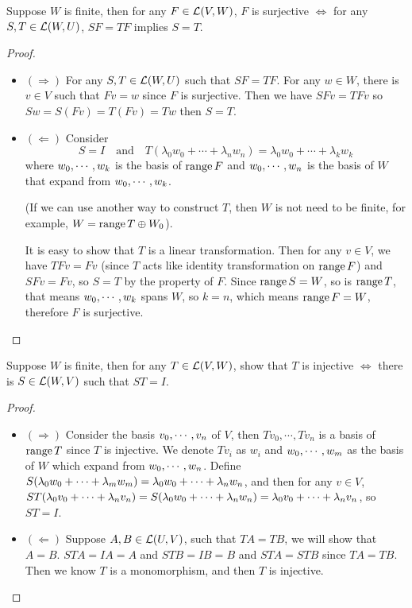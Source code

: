 \documentclass[../main.tex]{subfiles}
\begin{document}
\begin{exercise*}
  Suppose $W$ is finite, then for any $F \in \LT(V, W)$, $F$ is surjective $\iff$ for any $S, T \in \LT(W, U)$, $SF = TF$ implies $S = T$.
\end{exercise*}
\begin{proof}
  ~
  \begin{itemize}
    \item $(\Rightarrow)$ For any $S, T \in \LT(W, U)$ such that $SF = TF$. For any $w \in W$,
          there is $v \in V$ such that $Fv = w$ since $F$ is surjective. Then we have
          $SFv = TFv$ so $Sw = S(Fv) = T(Fv) = Tw$ then $S = T$.
    \item $(\Leftarrow)$ Consider
          \[
          S = I \quad \text{and} \quad T(\lambda_0w_0 + \cdots + \lambda_n w_n) = \lambda_0w_0 + \cdots + \lambda_kw_k
          \]
          where $\join{w}{k}$ is the basis of $\rangev F$ and
          $\join{w}{n}$ is the basis of $W$ that expand from $\join{w}{k}$.

          (If we can use another way to construct $T$, then $W$ is not need to be finite, for example, $W = \rangev T \oplus W_0$).

          It is easy to show that $T$ is a linear transformation. Then for any $v \in V$, we have
          $TFv = Fv$ (since $T$ acts like identity transformation on $\rangev F$) and $SFv = Fv$,
          so $S = T$ by the property of $F$. Since $\rangev S = W$, so is $\rangev T$, that means
          $\join{w}{k}$ spans $W$, so $k = n$, which means $\rangev F = W$, therefore $F$ is surjective.
  \end{itemize}
\end{proof}

\setcounter{exercise}{18}
\begin{exercise}
  Suppose $W$ is finite, then for any $T \in \LT(V, W)$,
  show that $T$ is injective $\iff$ there is $S \in \LT(W, V)$ such that $ST = I$.
\end{exercise}
\begin{proof}
  ~
  \begin{itemize}
    \item $(\Rightarrow)$ Consider the basis $\join{v}{n}$ of $V$, then $Tv_0, \cdots, Tv_n$
          is a basis of $\rangev T$ since $T$ is injective. We denote $Tv_i$ as $w_i$
          and $\join{w}{m}$ as the basis of $W$ which expand from $\join{w}{n}$.
          Define $S(\joinp[+]{\lambda}{w}{m}) = \joinp[+]{\lambda}{w}{n}$, and then for any
          $v \in V$, $ST(\joinp[+]{\lambda}{v}{n}) = S(\lambda_0w_0 + \cdots + \lambda_nw_n) = \joinp[+]{\lambda}{v}{n}$,
          so $ST = I$.
    \item $(\Leftarrow)$ Suppose $A, B \in \LT(U, V)$, such that $TA = TB$, we will show that $A = B$.
          $STA = IA = A$ and $STB = IB = B$ and $STA = STB$ since $TA = TB$.
          Then we know $T$ is a monomorphism, and then $T$ is injective.
  \end{itemize}
\end{proof}
\end{document}
